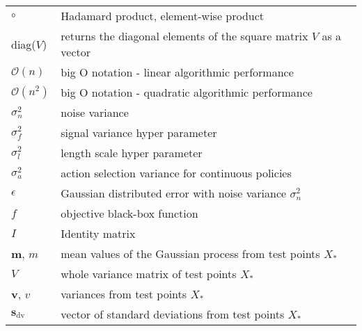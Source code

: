 \begin{tabular}{l l}
    $\circ$ & Hadamard product, element-wise product\\
    diag($V$) & returns the diagonal elements of the square matrix $V$ as a vector\\
    $\mathcal{O}(n)$ & big O notation - linear algorithmic performance\\
    $\mathcal{O}(n^2)$ & big O notation - quadratic algorithmic performance\\
    $\sigma_n^2$ & noise variance\\
    $\sigma_f^2$ & signal variance hyper parameter\\
    $\sigma_l^2$ & length scale hyper parameter\\
    $\sigma_a^2$ & action selection variance for continuous policies\\
    $\epsilon$ & Gaussian distributed error with noise variance $\sigma_n^2$\\
    $f$ & objective black-box function\\
    $I$ & Identity matrix\\
    $\mathbf{m}$, $m$ & mean values of the Gaussian process from test points $X_*$\\
    $V$ & whole variance matrix of test points $X_*$\\
    $\mathbf{v}$, $v$ & variances from test points $X_*$\\
    $\mathbf{s}_\mathrm{dv}$ & vector of standard deviations from test points $X_*$\\
\end{tabular}
